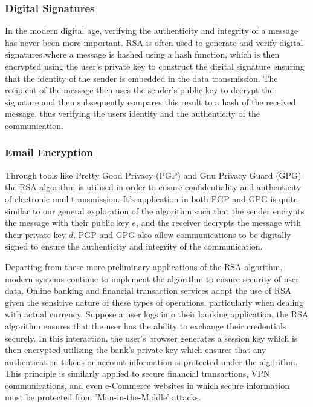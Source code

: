 \documentclass{article}
\begin{document}
\subsubsection{Digital Signatures}
In the modern digital age, verifying the authenticity and integrity of a message has never been more important. RSA is often used to generate and verify digital signatures where a message is hashed using a hash function, which is then encrypted using the user's private key to construct the digital signature ensuring that the identity of the sender is embedded in the data transmission. The recipient of the message then uses the sender's public key to decrypt the signature and then subsequently compares this result to a hash of the received message, thus verifying the users identity and the authenticity of the communication.

\subsubsection{Email Encryption}
Through tools like Pretty Good Privacy (PGP) and Gnu Privacy Guard (GPG) the RSA algorithm is utilised in order to ensure confidentiality and authenticity of electronic mail transmission. It's application in both PGP and GPG is quite similar to our general exploration of the algorithm such that the sender encrypts the message with their public key $e$, and the receiver decrypts the message with their private key $d$. PGP and GPG also allow communications to be digitally signed to ensure the authenticity and integrity of the communication. 

Departing from these more preliminary applications of the RSA algorithm, modern systems continue to implement the algorithm to ensure security of user data. Online banking and financial transaction services adopt the use of RSA given the sensitive nature of these types of operations, particularly when dealing with actual currency. Suppose a user logs into their banking application, the RSA algorithm ensures that the user has the ability to exchange their credentials securely. In this interaction, the user's browser generates a session key which is then encrypted utilising the bank's private key which ensures that any authentication tokens or account information is protected under the algorithm. This principle is similarly applied to secure financial transactions, VPN communications, and even e-Commerce websites in which secure information must be protected from 'Man-in-the-Middle' attacks. 
\end{document}
